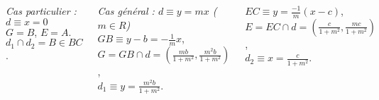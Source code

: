 \documentclass[10pt]{beamer}
\begin{document}
{\begin{columns}[t]
		      
		      \textit{Cas particulier : $d\equiv x=0$} \\ \medskip 
		      $G=B$, $E=A$.\\
		      $d_1\cap d_2=B \in BC$. \\ \bigskip

		      \textit{Cas général : $d\equiv y=mx$ ($m\in R$)}  \\ \medskip 
		      $GB\equiv y-b=-\frac{1}{m}x$, \\		    
		      $G = GB\cap d = (\frac{mb}{1+m^2},\frac{m^2b}{1+m^2})$, \\ 
		      $d_1\equiv y = \frac{m^2b}{1+m^2}$. \\ \bigskip

		      $EC\equiv y=\frac{-1}{m}(x-c)$, \\
		      $E = EC\cap d = (\frac{c}{1+m^2},\frac{mc}{1+m^2})$, \\
		      $d_2 \equiv x=\frac{c}{1+m^2}$. 
		      
	\end{columns}
  
	}
	
\end{document}

